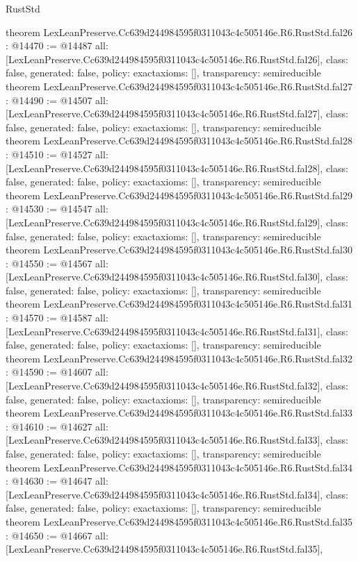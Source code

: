\begin{lexlean}{RustStd}
\begin{coremodule}
{}
theorem LexLeanPreserve.Cc639d244984595f0311043c4c505146e.R6.RustStd.fal26 : @14470 := @14487 {
  all: [LexLeanPreserve.Cc639d244984595f0311043c4c505146e.R6.RustStd.fal26],
  class: false,
  generated: false,
  policy: exact{axioms: []},
  transparency: semireducible
}
theorem LexLeanPreserve.Cc639d244984595f0311043c4c505146e.R6.RustStd.fal27 : @14490 := @14507 {
  all: [LexLeanPreserve.Cc639d244984595f0311043c4c505146e.R6.RustStd.fal27],
  class: false,
  generated: false,
  policy: exact{axioms: []},
  transparency: semireducible
}
theorem LexLeanPreserve.Cc639d244984595f0311043c4c505146e.R6.RustStd.fal28 : @14510 := @14527 {
  all: [LexLeanPreserve.Cc639d244984595f0311043c4c505146e.R6.RustStd.fal28],
  class: false,
  generated: false,
  policy: exact{axioms: []},
  transparency: semireducible
}
theorem LexLeanPreserve.Cc639d244984595f0311043c4c505146e.R6.RustStd.fal29 : @14530 := @14547 {
  all: [LexLeanPreserve.Cc639d244984595f0311043c4c505146e.R6.RustStd.fal29],
  class: false,
  generated: false,
  policy: exact{axioms: []},
  transparency: semireducible
}
theorem LexLeanPreserve.Cc639d244984595f0311043c4c505146e.R6.RustStd.fal30 : @14550 := @14567 {
  all: [LexLeanPreserve.Cc639d244984595f0311043c4c505146e.R6.RustStd.fal30],
  class: false,
  generated: false,
  policy: exact{axioms: []},
  transparency: semireducible
}
theorem LexLeanPreserve.Cc639d244984595f0311043c4c505146e.R6.RustStd.fal31 : @14570 := @14587 {
  all: [LexLeanPreserve.Cc639d244984595f0311043c4c505146e.R6.RustStd.fal31],
  class: false,
  generated: false,
  policy: exact{axioms: []},
  transparency: semireducible
}
theorem LexLeanPreserve.Cc639d244984595f0311043c4c505146e.R6.RustStd.fal32 : @14590 := @14607 {
  all: [LexLeanPreserve.Cc639d244984595f0311043c4c505146e.R6.RustStd.fal32],
  class: false,
  generated: false,
  policy: exact{axioms: []},
  transparency: semireducible
}
theorem LexLeanPreserve.Cc639d244984595f0311043c4c505146e.R6.RustStd.fal33 : @14610 := @14627 {
  all: [LexLeanPreserve.Cc639d244984595f0311043c4c505146e.R6.RustStd.fal33],
  class: false,
  generated: false,
  policy: exact{axioms: []},
  transparency: semireducible
}
theorem LexLeanPreserve.Cc639d244984595f0311043c4c505146e.R6.RustStd.fal34 : @14630 := @14647 {
  all: [LexLeanPreserve.Cc639d244984595f0311043c4c505146e.R6.RustStd.fal34],
  class: false,
  generated: false,
  policy: exact{axioms: []},
  transparency: semireducible
}
theorem LexLeanPreserve.Cc639d244984595f0311043c4c505146e.R6.RustStd.fal35 : @14650 := @14667 {
  all: [LexLeanPreserve.Cc639d244984595f0311043c4c505146e.R6.RustStd.fal35],
}
\end{coremodule}
\end{lexlean}

